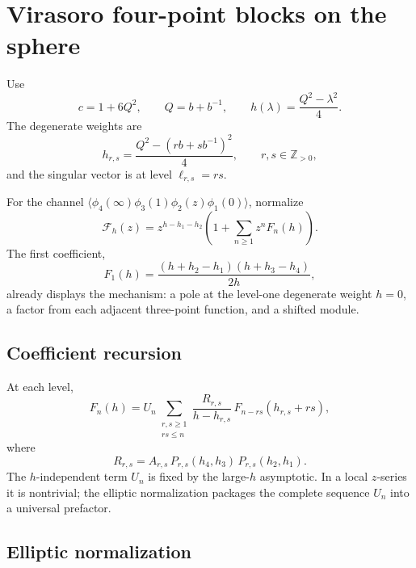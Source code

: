 \documentclass[11pt]{article}
\newcommand{\F}{\mathcal F}
\begin{document}
\section{Virasoro four-point blocks on the sphere}
\label{sec:vir-sphere}

Use
\begin{equation}
 c=1+6Q^2,\qquad Q=b+b^{-1},
\qquad
 h(\lambda)=\frac{Q^2-\lambda^2}{4}.
 \label{eq:vir-parameterization}
\end{equation}
The degenerate weights are
\begin{equation}
 h_{r,s}
 =
 \frac{Q^2-(rb+s b^{-1})^2}{4},
 \qquad r,s\in\mathbb Z_{>0},
 \label{eq:vir-kac-weight}
\end{equation}
and the singular vector is at level
\(\ell_{r,s}=rs\).

For the channel
\(\langle\phi_4(\infty)\phi_3(1)\phi_2(z)\phi_1(0)\rangle\),
normalize
\begin{equation}
 \F_h(z)
 =
 z^{h-h_1-h_2}
 \left(1+\sum_{n\ge1}z^nF_n(h)\right).
 \label{eq:vir-local-block}
\end{equation}
The first coefficient,
\begin{equation}
 F_1(h)
 =
 \frac{(h+h_2-h_1)(h+h_3-h_4)}{2h},
 \label{eq:vir-level-one}
\end{equation}
already displays the mechanism: a pole at the level-one degenerate weight
\(h=0\), a factor from each adjacent three-point function, and a shifted
module.

\subsection{Coefficient recursion}

At each level,
\begin{equation}
 F_n(h)
 =
 U_n
 \sum_{\substack{r,s\ge1\\rs\le n}}
 \frac{R_{r,s}}{h-h_{r,s}}\,
 F_{n-rs}(h_{r,s}+rs),
 \label{eq:vir-coefficient-recursion}
\end{equation}
where
\begin{equation}
 R_{r,s}
 =
 A_{r,s}\,
 P_{r,s}(h_4,h_3)\,
 P_{r,s}(h_2,h_1).
 \label{eq:vir-residue-coefficient}
\end{equation}
The \(h\)-independent term \(U_n\) is fixed by the large-\(h\) asymptotic.
In a local \(z\)-series it is nontrivial; the elliptic normalization packages
the complete sequence \(U_n\) into a universal prefactor.

\subsection{Elliptic normalization}
\end{document}
